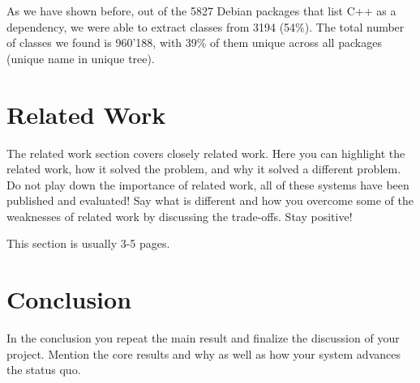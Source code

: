 \documentclass[a4paper,11pt,oneside]{report}
\begin{document}
As we have shown before, out of the 5827 Debian packages that list C++ as a dependency, we were able to extract classes from 3194 (54\%).
The total number of classes we found is 960'188, with 39\% of them unique across all packages (unique name in unique tree).



\chapter{Related Work}

The related work section covers closely related work. Here you can highlight
the related work, how it solved the problem, and why it solved a different
problem. Do not play down the importance of related work, all of these
systems have been published and evaluated! Say what is different and how
you overcome some of the weaknesses of related work by discussing the 
trade-offs. Stay positive!

This section is usually 3-5 pages.



\chapter{Conclusion}

In the conclusion you repeat the main result and finalize the discussion of
your project. Mention the core results and why as well as how your system
advances the status quo.

\cleardoublepage
{}
{}
\printbibliography

%
%
\end{document}
